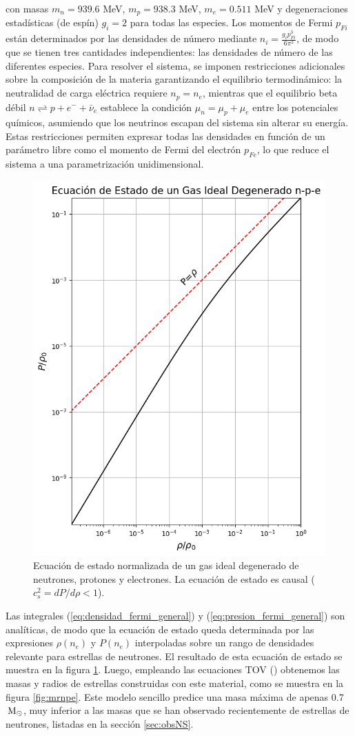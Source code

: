 con masas $m_n = 939.6$ MeV, $m_p = 938.3$ MeV, $m_e = 0.511$ MeV y degeneraciones estadísticas (de espín) $g_i = 2$ para todas las especies. Los momentos de Fermi $p_{Fi}$ están determinados por las densidades de número mediante $n_i = \frac{g_i p_{Fi}^3}{6\pi^2}$, de modo que se tienen tres cantidades independientes: las densidades de número de las diferentes especies. Para resolver el sistema, se imponen restricciones adicionales sobre la composición de la materia garantizando el equilibrio termodinámico: la neutralidad de carga eléctrica requiere $n_p = n_e$, mientras que el equilibrio beta débil $n \rightleftharpoons p + e^- + \bar{\nu}_e$ establece la condición $\mu_n = \mu_p + \mu_e$ entre los potenciales químicos, asumiendo que los neutrinos escapan del sistema sin alterar su energía. Estas restricciones permiten expresar todas las densidades en función de un parámetro libre como el momento de Fermi del electrón $p_{Fe}$, lo que reduce el sistema a una parametrización unidimensional.

\begin{figure}[h]
	\centering
	\includegraphics[width=0.55\linewidth]{Figuras/gas_npe}
	\caption{Ecuación de estado normalizada de un gas ideal degenerado de neutrones, protones y electrones. La ecuación de estado es causal ($c_s^2 = dP/d\rho < 1$).}
	\label{fig:eosnpe}
\end{figure}

Las integrales (\ref{eq:densidad_fermi_general}) y (\ref{eq:presion_fermi_general}) son analíticas, de modo que la ecuación de estado queda determinada por las expresiones $\rho(n_e)$ y $P(n_e)$ interpoladas sobre un rango de densidades relevante para estrellas de neutrones. El resultado de esta ecuación de estado se muestra en la figura \ref{fig:eosnpe}. Luego, empleando las ecuaciones TOV (\sistemaTOV) obtenemos las masas y radios de estrellas construidas con este material, como se muestra en la figura \ref{fig:mrnpe}. Este modelo sencillo predice una masa máxima de apenas 0.7$\,\text{M}_\odot$, muy inferior a las masas que se han observado recientemente de estrellas de neutrones, listadas en la sección \ref{sec:obsNS}.

